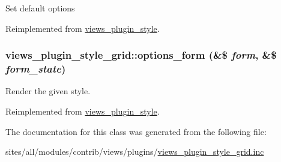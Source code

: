 Set default options 

Reimplemented from \hyperlink{classviews__plugin__style_95b6f2eadf403ff36f1ff2860294b3c2}{views\_\-plugin\_\-style}.\hypertarget{classviews__plugin__style__grid_275eb0e00406028e000268ae389d17a3}{
\subsubsection[{options\_\-form}]{\setlength{\rightskip}{0pt plus 5cm}views\_\-plugin\_\-style\_\-grid::options\_\-form (\&\$ {\em form}, \/  \&\$ {\em form\_\-state})}}
\label{classviews__plugin__style__grid_275eb0e00406028e000268ae389d17a3}


Render the given style. 

Reimplemented from \hyperlink{classviews__plugin__style_fe3d437ff4398315b15c4e60975dbb1c}{views\_\-plugin\_\-style}.

The documentation for this class was generated from the following file:\begin{CompactItemize}
\item 
sites/all/modules/contrib/views/plugins/\hyperlink{views__plugin__style__grid_8inc}{views\_\-plugin\_\-style\_\-grid.inc}\end{CompactItemize}
